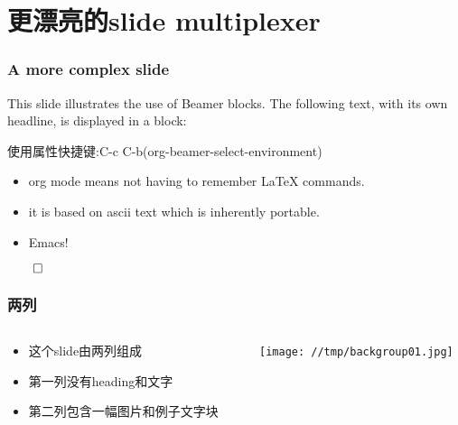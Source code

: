 \documentclass[bigger]{beamer}
\begin{document}
\section{更漂亮的slide multiplexer}
\label{sec-5}
\begin{frame}
\frametitle{A more complex slide}
\label{sec-5-1}

This slide illustrates the use of Beamer blocks.  The following text,
with its own headline, is displayed in a block:

使用属性快捷键:C-c C-b(org-beamer-select-environment)
\begin{theorem}
\label{sec-5-1-1}

\begin{itemize}
\item org mode means not having to remember \LaTeX{} commands.
\item it is based on ascii text which is inherently portable.
\item Emacs!
\end{itemize}

    \hfill \(\qed\)
\end{theorem}
\end{frame}
\begin{frame}
\frametitle{两列}
\label{sec-5-2}
\begin{columns}
\begin{column}{0.4\textwidth}
\label{sec-5-2-1}

\begin{itemize}
\item 这个slide由两列组成
\item 第一列没有heading和文字
\item 第二列包含一幅图片和例子文字块
\end{itemize}
\end{column}
\begin{column}{0.6\textwidth}
\begin{example}[一幅图片]
\label{sec-5-2-2}

　\texttt{[image: //tmp/backgroup01.jpg]}
\end{example}
\end{column}
\end{columns}
\end{frame}
\end{document}
